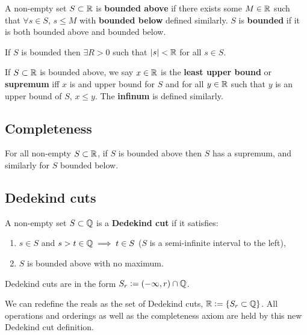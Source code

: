 \documentclass[../Year1/Year1.tex]{subfiles}
\begin{document}
\begin{definition}[Bounded]
    A non-empty set $S\subset\mathbb{R}$ is \textbf{bounded above} if there exists some $M\in\mathbb{R}$ such that $\forall s\in S$, $s\leq M$ with \textbf{bounded below} defined similarly. $S$ is \textbf{bounded} if it is both bounded above and bounded below.
\end{definition}

\begin{theorem}
    If $S$ is bounded then $\exists R>0$ such that $|s|<\mathbb{R}$ for all $s\in S$.
\end{theorem}

\begin{definition}
    If $S\subset\mathbb{R}$ is bounded above, we say $x\in\mathbb{R}$ is the \textbf{least upper bound} or \textbf{supremum} iff $x$ is and upper bound for $S$ and for all $y\in\mathbb{R}$ such that $y$ is an upper bound of $S$, $x\leq y$. The \textbf{infinum} is defined similarly.
\end{definition}

\subsection{Completeness}

\begin{theorem}
    For all non-empty $S\subset\mathbb{R}$, if $S$ is bounded above then $S$ has a supremum, and similarly for $S$ bounded below.
\end{theorem}

\subsection{Dedekind cuts}

\begin{definition}
    A non-empty set $S\subset\mathbb{Q}$ is a \textbf{Dedekind cut} if it satisfies: \begin{enumerate}
        \item $s\in S$ and $s>t\in\mathbb{Q} \implies t\in S$ ($S$ is a semi-infinite interval to the left),
        \item $S$ is bounded above with no maximum.
    \end{enumerate} Dedekind cuts are in the form $S_r:=(-\infty,r)\cap\mathbb{Q}$.
\end{definition}

\begin{theorem}
    We can redefine the reals as the set of Dedekind cuts, $\mathbb{R}:= \{S_r\subset\mathbb{Q}\}$. All operations and orderings as well as the completeness axiom are held by this new Dedekind cut definition.
\end{theorem}
\end{document}
